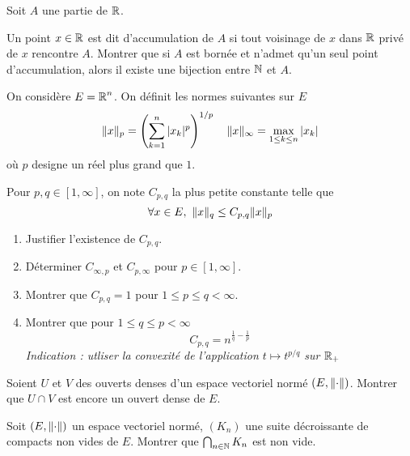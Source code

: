 \documentclass[10pt]{scrartcl}
\begin{document}
    \begin{exo}
        Soit $A$ une partie de $\operatorname{\mathbb R}$. 

        Un point $x\in \operatorname{\mathbb R}$ est dit d'accumulation de $A$ si tout voisinage de $x$ dans $\operatorname{\mathbb R}$ privé de $x$ rencontre $A$. 
        Montrer que si $A$ est bornée et n'admet qu'un seul point d'accumulation, alors il existe une bijection entre $\operatorname{\mathbb N}$ et $A$.
    \end{exo}

    \begin{exo}
        On considère $E=\operatorname{\mathbb R}^n$. On définit les normes suivantes sur $E$ 
        \[
            \lVert x\rVert_p=\left(\sum_{k=1}^n|x_k|^p\right)^{1/p}\quad \lVert x\rVert_\infty=\max_{1\leq k\leq n}|x_k|
        \]
        où $p$ designe un réel plus grand que $1$.

        Pour $p,q\in[1,\infty]$, on note $C_{p,q}$ la plus petite constante telle que 
        \[
            \forall x\in E,\ \lVert x\rVert_q\leq C_{p,q}\lVert x\rVert_p
        \]
        \begin{enumerate}
            \item Justifier l'existence de $C_{p,q}$.
            \item Déterminer $C_{\infty,p}$ et $C_{p,\infty}$ pour $p\in[1,\infty]$.
            \item Montrer que $C_{p,q}=1$ pour $1\leq p\leq q<\infty$. 
            \item Montrer que pour $1\leq q\leq p<\infty$ 
            \[
                C_{p,q}=n^{\frac1q-\frac1p}
            \]
            \textit{Indication : utliser la convexité de l'application $t\mapsto t^{p/q}$ sur $\operatorname{\mathbb R}_+$}
        \end{enumerate}
    \end{exo}

    \begin{exo}
        Soient $U$ et $V$ des ouverts denses d'un espace vectoriel normé $(E,\lVert \cdot\rVert)$. 
        Montrer que $U\cap V$ est encore un ouvert dense de $E$.
    \end{exo}

    \begin{exo}
        Soit $(E,\lVert \cdot\rVert)$ un espace vectoriel normé, $(K_n)$ une suite décroissante de compacts non vides de $E$.
        Montrer que $\bigcap_{n\in\operatorname{\mathbb N}}K_n$ est non vide.
    \end{exo}
\end{document}
